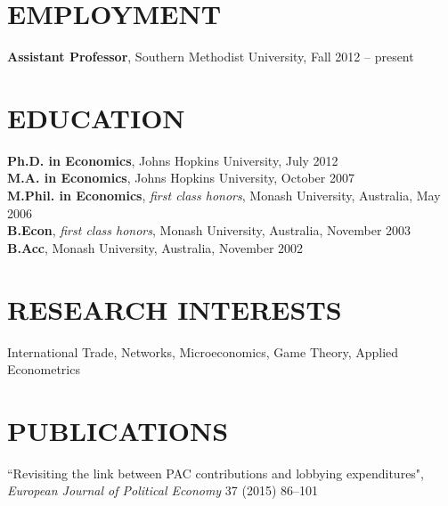\documentclass[11pt]{res}
\begin{document}
\begin{resume}
\hspace{-0.5in}\makebox[6.1in]{\hrulefill}

\section{EMPLOYMENT} \vspace{2mm}
{\bf Assistant Professor}, Southern Methodist University, Fall 2012 -- present

\section{EDUCATION} \vspace{2mm}
    {\bf Ph.D. in Economics}, Johns Hopkins University, July 2012 \vspace{.5mm}\\
    {\bf M.A. in Economics}, Johns Hopkins University, October 2007\vspace{1.5mm}\\
    {\bf M.Phil. in Economics}, \emph{first class honors}, Monash University, Australia, May 2006\vspace{1.5mm}\\
    {\bf B.Econ}, \emph{first class honors}, Monash University, Australia, November 2003\vspace{1.5mm}\\
    {\bf B.Acc}, Monash University, Australia, November 2002


\section{RESEARCH INTERESTS}\vspace{2mm}
International Trade, Networks, Microeconomics, Game Theory, Applied Econometrics

\section{PUBLICATIONS}\vspace{2mm}
{``Revisiting the link between PAC contributions and lobbying expenditures", \emph{European Journal of Political Economy}} 37 (2015) 86--101 \vspace{1.5mm}


\end{resume}
\end{document}
